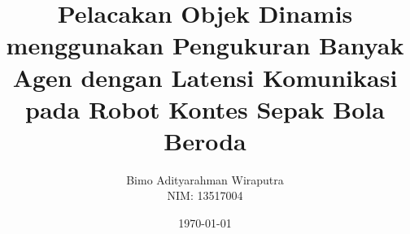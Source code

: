 \documentclass[12pt, a4paper, onecolumn, oneside, final]{report}
\begin{document}
\title{Pelacakan Objek Dinamis menggunakan Pengukuran Banyak Agen dengan Latensi Komunikasi pada Robot Kontes Sepak Bola Beroda}
\date{\today}
\author{
    Bimo Adityarahman Wiraputra \\
    NIM: 13517004
}

\setcounter{page}{0}



% 

\pagestyle{plain}

% 
% 

\renewcommand*\contentsname{DAFTAR ISI}
\renewcommand*\listfigurename{DAFTAR GAMBAR}
\renewcommand*\listtablename{DAFTAR TABEL}
\renewcommand*\bibname{DAFTAR PUSTAKA}

\tableofcontents
{%
    \let\oldnumberline\numberline%
    \renewcommand{\numberline}{\figurename~\oldnumberline}%
    \listoffigures%
}
{%
    \let\oldnumberline\numberline%
    \renewcommand{\numberline}{\tablename~\oldnumberline}%
    \listoftables%
}


\renewcommand{\chaptername}{BAB}
\renewcommand{\thechapter}{\Roman{chapter}}




% 
% 

\begingroup
\renewcommand{\baselinestretch}{1.0}
\printbibliography[heading=bibintoc]
\endgroup


%     
%     
\end{document}
